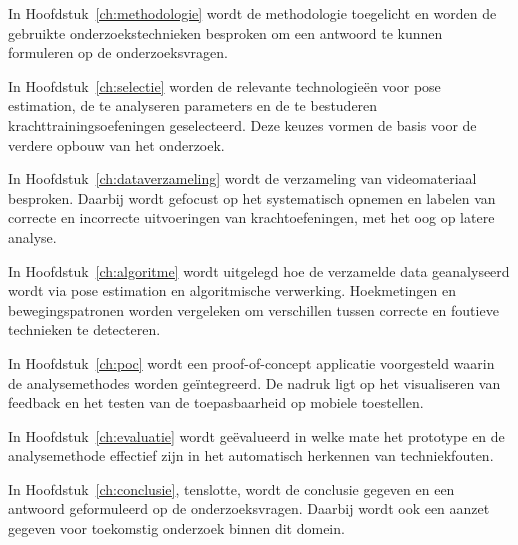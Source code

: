 In Hoofdstuk~\ref{ch:methodologie} wordt de methodologie toegelicht en worden de gebruikte onderzoekstechnieken besproken om een antwoord te kunnen formuleren op de onderzoeksvragen.

In Hoofdstuk~\ref{ch:selectie} worden de relevante technologieën voor pose estimation, de te analyseren parameters en de te bestuderen krachttrainingsoefeningen geselecteerd. Deze keuzes vormen de basis voor de verdere opbouw van het onderzoek.

In Hoofdstuk~\ref{ch:dataverzameling} wordt de verzameling van videomateriaal besproken. Daarbij wordt gefocust op het systematisch opnemen en labelen van correcte en incorrecte uitvoeringen van krachtoefeningen, met het oog op latere analyse.

In Hoofdstuk~\ref{ch:algoritme} wordt uitgelegd hoe de verzamelde data geanalyseerd wordt via pose estimation en algoritmische verwerking. Hoekmetingen en bewegingspatronen worden vergeleken om verschillen tussen correcte en foutieve technieken te detecteren.

In Hoofdstuk~\ref{ch:poc} wordt een proof-of-concept applicatie voorgesteld waarin de analysemethodes worden geïntegreerd. De nadruk ligt op het visualiseren van feedback en het testen van de toepasbaarheid op mobiele toestellen.

In Hoofdstuk~\ref{ch:evaluatie} wordt geëvalueerd in welke mate het prototype en de analysemethode effectief zijn in het automatisch herkennen van techniekfouten. 

In Hoofdstuk~\ref{ch:conclusie}, tenslotte, wordt de conclusie gegeven en een antwoord geformuleerd op de onderzoeksvragen. Daarbij wordt ook een aanzet gegeven voor toekomstig onderzoek binnen dit domein.